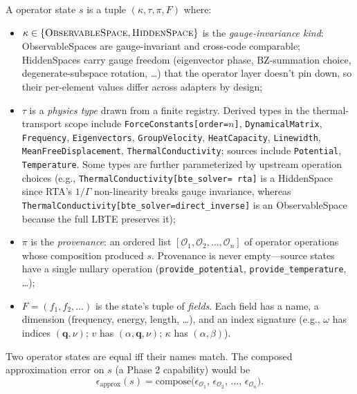\documentclass[11pt,a4paper]{article}
\begin{document}
A operator state $s$ is a tuple $(\kappa, \tau, \pi, F)$ where:
\begin{itemize}[leftmargin=2em]
  \item $\kappa \in \{\textsc{ObservableSpace}, \textsc{HiddenSpace}\}$ is the
        \emph{gauge-invariance kind}: ObservableSpaces are gauge-invariant and cross-code
        comparable; HiddenSpaces carry gauge freedom (eigenvector phase, BZ-summation
        choice, degenerate-subspace rotation, …) that the operator layer doesn't pin down,
        so their per-element values differ across adapters by design;
  \item $\tau$ is a \emph{physics type} drawn from a finite registry. Derived types in
        the thermal-transport scope include \texttt{ForceConstants[order=$n$]},
        \texttt{DynamicalMatrix}, \texttt{Frequency}, \texttt{Eigenvectors},
        \texttt{GroupVelocity}, \texttt{HeatCapacity}, \texttt{Linewidth},
        \texttt{MeanFreeDisplacement}, \texttt{ThermalConductivity}; sources include
        \texttt{Potential}, \texttt{Temperature}. Some types are further parameterized
        by upstream operation choices (e.g., \texttt{ThermalConductivity[bte\_solver=
        rta]} is a HiddenSpace since RTA's $1/\Gamma$ non-linearity breaks gauge
        invariance, whereas \texttt{ThermalConductivity[bte\_solver=direct\_inverse]}
        is an ObservableSpace because the full LBTE preserves it);
  \item $\pi$ is the \emph{provenance}: an ordered list $[\mathcal{O}_1, \mathcal{O}_2,
        \ldots, \mathcal{O}_n]$ of operator operations whose composition produced $s$.
        Provenance is never empty---source states have a single nullary operation
        (\texttt{provide\_potential}, \texttt{provide\_temperature}, \ldots);
  \item $F = (f_1, f_2, \ldots)$ is the state's tuple of \emph{fields}. Each field has
        a name, a dimension (frequency, energy, length, …), and an index signature
        (e.g., $\omega$ has indices $(\mathbf{q}, \nu)$; $v$ has $(\alpha, \mathbf{q},
        \nu)$; $\kappa$ has $(\alpha, \beta)$).
\end{itemize}
Two operator states are equal iff their names match. The composed approximation error
on $s$ (a Phase 2 capability) would be
\begin{equation}
  \epsilon_{\text{approx}}(s) = \mathrm{compose}\bigl(\epsilon_{\mathcal{O}_1},\, \epsilon_{\mathcal{O}_2},\, \ldots,\, \epsilon_{\mathcal{O}_n}\bigr).
\end{equation}
\end{document}
